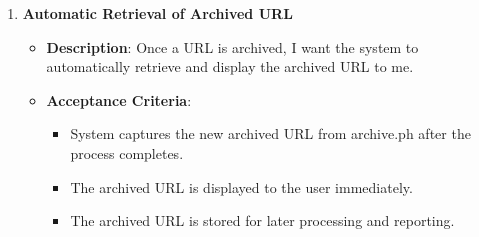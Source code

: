 \begin{enumerate}
    \item \textbf{Automatic Retrieval of Archived URL}
    \begin{itemize}
        \item \textbf{Description}: Once a URL is archived, I want the system to automatically retrieve and display the archived URL to me.
        \item \textbf{Acceptance Criteria}:
        \begin{itemize}
            \item System captures the new archived URL from archive.ph after the process completes.
            \item The archived URL is displayed to the user immediately.
            \item The archived URL is stored for later processing and reporting.
        \end{itemize}
    \end{itemize}
\end{enumerate}